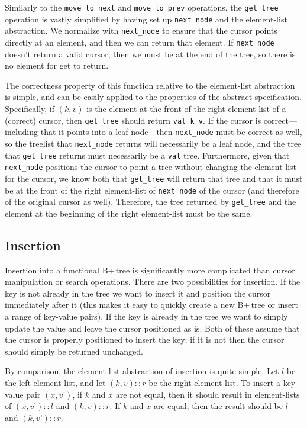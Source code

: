 \documentclass[a4paper,12pt]{article}
\begin{document}
Similarly to the \texttt{move\_to\_next} and \texttt{move\_to\_prev} operations, the \texttt{get\_tree} operation is vastly simplified by having set up \texttt{next\_node} and the element-list abstraction. We normalize with \texttt{next\_node} to ensure that the cursor points directly at an element, and then we can return that element. If \texttt{next\_node} doesn’t return a valid cursor, then we must be at the end of the tree, so there is no element for get to return.

The correctness property of this function relative to the element-list abstraction is simple, and can be easily applied to the properties of the abstract specification. Specifically, if $(k,v)$ is the element at the front of the right element-list of a (correct) cursor, then \texttt{get\_tree} should return \texttt{val k v}. If the cursor is correct---including that it points into a leaf node---then \texttt{next\_node} must be correct as well, so the treelist that \texttt{next\_node} returns will necessarily be a leaf node, and the tree that \texttt{get\_tree} returns must necessarily be a \texttt{val} tree. Furthermore, given that \texttt{next\_node} positions the cursor to point a tree without changing the element-list for the cursor, we know both that \texttt{get\_tree} will return that tree and that it must be at the front of the right element-list of \texttt{next\_node} of the cursor (and therefore of the original cursor as well). Therefore, the tree returned by \texttt{get\_tree} and the element at the beginning of the right element-list must be the same.

\subsection{Insertion}

Insertion into a functional B+\,tree is significantly more complicated than cursor manipulation or search operations. There are two possibilities for insertion. If the key is not already in the tree we want to insert it and position the cursor immediately after it (this makes it easy to quickly create a new B+\,tree or insert a range of key-value pairs). If the key is already in the tree we want to simply update the value and leave the cursor positioned as is. Both of these assume that the cursor is properly positioned to insert the key; if it is not then the cursor should simply be returned unchanged.

By comparison, the element-list abstraction of insertion is quite simple. Let $l$ be the left element-list, and let $(k,v)::r$ be the right element-list. To insert a key-value pair $(x,v’)$, if $k$ and $x$ are not equal, then it should result in element-lists of $(x,v’)::l$ and $(k,v)::r$. If $k$ and $x$ are equal, then the result should be $l$ and $(k,v’)::r$.
\end{document}
